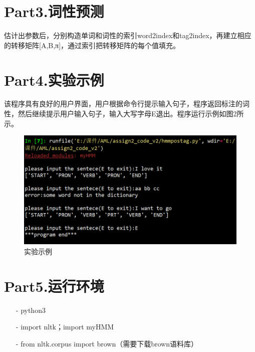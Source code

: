 \documentclass[a4paper,UTF8]{article}
\theoremstyle{definition}
\begin{document}
\section*{Part3.词性预测 }
	估计出参数后，分别构造单词和词性的索引word2index和tag2index，再建立相应的转移矩阵[A,B,π]，通过索引把转移矩阵的每个值填充。

\section*{Part4.实验示例 }
    该程序具有良好的用户界面，用户根据命令行提示输入句子，程序返回标注的词性，然后继续提示用户输入句子，输入大写字母E退出。程序运行示例如图2所示。
    \begin{figure}
      \centering
      \includegraphics[width=13cm]{2.png}
      \caption{实验示例}
      \label{fig:1}
    \end{figure}
    




\section*{Part5.运行环境 }
    \begin{itemize}
    \item[-]  python3 
    \item[-]  import nltk；import myHMM
    \item[-]  from nltk.corpus import brown（需要下载brown语料库） 
    \end{itemize}
\end{document}
